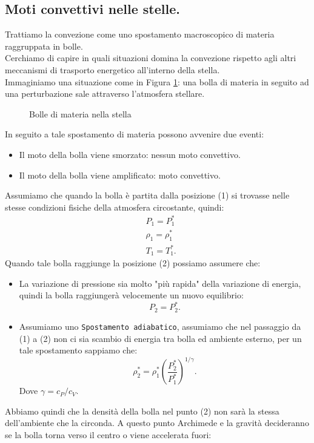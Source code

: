 \subsection{Moti convettivi  nelle stelle.}
\label{subsec:Moti convettivi  nelle stelle.}
Trattiamo la convezione come uno spostamento macroscopico di materia raggruppata in bolle.\\
Cerchiamo di capire in quali situazioni domina la convezione rispetto agli altri meccanismi di trasporto energetico all'interno della stella. \\
Immaginiamo una situazione come in Figura \ref{fig:bolle-di-materia-nella-stella}: una bolla di materia in seguito ad una perturbazione sale attraverso l'atmosfera stellare.
\begin{figure}[H]
    \centering
    \caption{Bolle di materia nella stella}
    \label{fig:bolle-di-materia-nella-stella}
\end{figure}
\noindent
In seguito a tale spostamento di materia possono avvenire due eventi:
\begin{itemize}
	\item Il moto della bolla viene smorzato: nessun moto convettivo.
	\item Il moto della bolla viene amplificato: moto convettivo.
\end{itemize}
Assumiamo che quando la bolla è partita dalla posizione (1) si trovasse nelle stesse condizioni fisiche della atmosfera circostante, quindi:
\[\begin{aligned}
	&P_1= P_1^*\\
	&\rho _1 = \rho _1^*\\
	&T_1= T_1^*
.\end{aligned}\]
Quando tale bolla raggiunge la posizione (2) possiamo assumere che:
\begin{itemize}
	\item La variazione di pressione sia molto "più rapida" della variazione di
		energia, quindi la bolla raggiungerà velocemente un nuovo equilibrio:
		\[
			P_2 = P_2^*
		.\] 
	\item Assumiamo uno \texttt{Spostamento adiabatico}, assumiamo che nel passaggio 
		da (1) a (2) non ci sia scambio di energia tra bolla ed ambiente esterno,
		per un tale spostamento sappiamo che:
		\[
			\rho _2^* = \rho_1^*\left( \frac{P_2^*}{P_1^*}\right)^{1/\gamma} 
		.\] 
		Dove $\gamma  = c_P/c_V$.
\end{itemize}
Abbiamo quindi che la densità della bolla nel punto (2) non sarà la stessa dell'ambiente che la circonda. A questo punto Archimede e la gravità decideranno se la bolla torna verso il centro o viene accelerata fuori:
